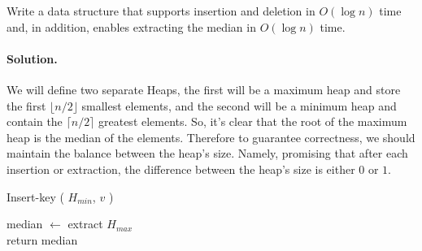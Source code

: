 \begin{exercise} 
Write a data structure that supports insertion and deletion in \(O(\log n)\) time and, in addition, enables extracting the median in \(O(\log n)\) time.
\end{exercise}

\paragraph{Solution.} We will define two separate Heaps, the first will be a maximum heap and store the first $ \lfloor n/2 \rfloor $ smallest elements, and the second will be a minimum heap and contain the $ \lceil n/2 \rceil$ greatest elements. So, it's clear that the root of the maximum heap is the median of the elements. Therefore to guarantee correctness, we should maintain the balance between the heap's size. Namely, promising that after each insertion or extraction, the difference between the heap's size is either $0$ or $1$.

\begin{algorithm}
 {
	 {
       Insert-key ( $H_{min}$, $v$ )
    }
}
\caption{Median Insert key.}
\end{algorithm}

\begin{algorithm}
median $\leftarrow$ extract $H_{max}$ \\   
return median 
\caption{Median-Extract.}
\end{algorithm}



\ifdefined\Book 

